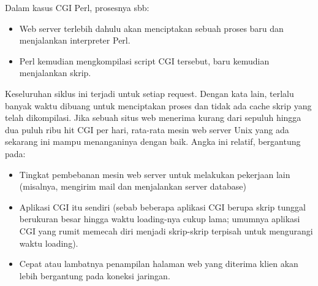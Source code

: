 Dalam kasus CGI Perl, prosesnya sbb: 
\begin{itemize}
	\item Web server terlebih dahulu akan menciptakan sebuah proses baru dan menjalankan interpreter Perl.  
	\item Perl kemudian mengkompilasi script CGI tersebut, baru kemudian menjalankan skrip.\end{itemize}
Keseluruhan siklus ini terjadi untuk setiap request. Dengan kata lain, terlalu banyak waktu dibuang untuk menciptakan proses dan tidak ada cache skrip yang telah dikompilasi. 
Jika sebuah situs web menerima kurang dari sepuluh hingga dua puluh ribu hit CGI per hari, rata-rata mesin web server Unix yang ada sekarang ini mampu menanganinya dengan baik. 
Angka ini relatif, bergantung pada:
\begin{itemize}
	\item Tingkat pembebanan mesin web server untuk melakukan pekerjaan lain (misalnya, mengirim mail dan menjalankan server database)
	\item Aplikasi CGI itu sendiri (sebab beberapa aplikasi CGI berupa skrip tunggal berukuran besar hingga waktu loading-nya cukup lama; umumnya aplikasi CGI yang rumit memecah diri menjadi skrip-skrip terpisah untuk mengurangi waktu loading). \par
	\item Cepat atau lambatnya penampilan halaman web yang diterima klien akan lebih bergantung pada koneksi jaringan.\end{itemize}
